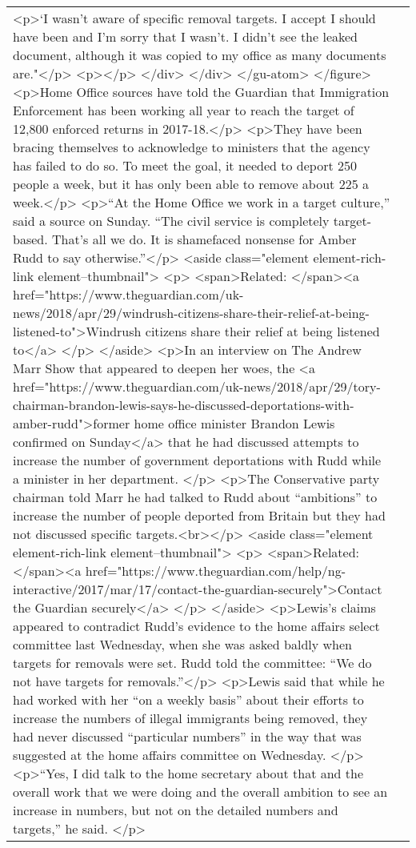 \documentclass[]{article}
\begin{document}
\begin{table}[!h]
{\begin{tabular}[t]{ll}
    <p>‘I wasn’t aware of specific removal targets. I accept I should have been and I’m sorry that I wasn’t. I didn’t see the leaked document, although it was copied to my office as many documents are."</p>
    <p></p>
   </div>
  </div>
 </gu-atom> 
</figure> 
<p>Home Office sources have told the Guardian that Immigration Enforcement has been working all year to reach the target of 12,800 enforced returns in 2017-18.</p> 
<p>They have been bracing themselves to acknowledge to ministers that the agency has failed to do so. To meet the goal, it needed to deport 250 people a week, but it has only been able to remove about 225 a week.</p> 
<p>“At the Home Office we work in a target culture,” said a source on Sunday. “The civil service is completely target-based. That’s all we do. It is shamefaced nonsense for Amber Rudd to say otherwise.”</p> 
<aside class="element element-rich-link element--thumbnail"> 
 <p> <span>Related: </span><a href="https://www.theguardian.com/uk-news/2018/apr/29/windrush-citizens-share-their-relief-at-being-listened-to">Windrush citizens share their relief at being listened to</a> </p> 
</aside> 
<p>In an interview on The Andrew Marr Show that appeared to deepen her woes, the <a href="https://www.theguardian.com/uk-news/2018/apr/29/tory-chairman-brandon-lewis-says-he-discussed-deportations-with-amber-rudd">former home office minister Brandon Lewis confirmed on Sunday</a> that he had discussed attempts to increase the number of government deportations with Rudd while a minister in her department. </p> 
<p>The Conservative party chairman told Marr he had talked to Rudd about “ambitions” to increase the number of people deported from Britain but they had not discussed specific targets.<br></p> 
<aside class="element element-rich-link element--thumbnail"> 
 <p> <span>Related: </span><a href="https://www.theguardian.com/help/ng-interactive/2017/mar/17/contact-the-guardian-securely">Contact the Guardian securely</a> </p> 
</aside> 
<p>Lewis’s claims appeared to contradict Rudd’s evidence to the home affairs select committee last Wednesday, when she was asked baldly when targets for removals were set. Rudd told the committee: “We do not have targets for removals.”</p> 
<p>Lewis said that while he had worked with her “on a weekly basis” about their efforts to increase the numbers of illegal immigrants being removed, they had never discussed “particular numbers” in the way that was suggested at the home affairs committee on Wednesday. </p> 
<p>“Yes, I did talk to the home secretary about that and the overall work that we were doing and the overall ambition to see an increase in numbers, but not on the detailed numbers and targets,” he said. </p> 

\end{tabular}}
\end{table}
\end{document}
